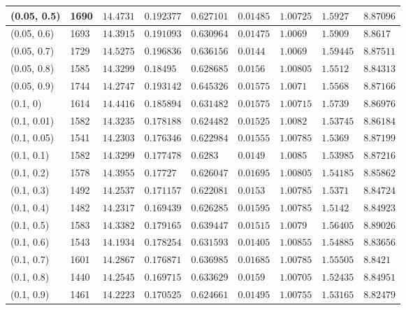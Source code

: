 \begin{center}
{\begin{longtable}{| l | p{} |  p{} | p{} | p{} | p{} | p{} | p{} | p{} |}
 (0.05, 0.5) & 1690  & $14.4731$ & $0.192377$ & $0.627101$ & $0.01485$ & $1.00725$ & $1.5927$ & $8.87096$ \\ \hline
 (0.05, 0.6) & 1693  & $14.3915$ & $0.191093$ & $0.630964$ & $0.01475$ & $1.0069$ & $1.5909$ & $8.8617$ \\ \hline
 (0.05, 0.7) & 1729  & $14.5275$ & $0.196836$ & $0.636156$ & $0.0144$ & $1.0069$ & $1.59445$ & $8.87511$ \\ \hline
 (0.05, 0.8) & 1585  & $14.3299$ & $0.18495$ & $0.628685$ & $0.0156$ & $1.00805$ & $1.5512$ & $8.84313$ \\ \hline
 (0.05, 0.9) & 1744  & $14.2747$ & $0.193142$ & $0.645326$ & $0.01575$ & $1.0071$ & $1.5568$ & $8.87166$ \\ \hline
 (0.1, 0) & 1614  & $14.4416$ & $0.185894$ & $0.631482$ & $0.01575$ & $1.00715$ & $1.5739$ & $8.86976$ \\ \hline
 (0.1, 0.01) & 1582  & $14.3235$ & $0.178188$ & $0.624482$ & $0.01525$ & $1.0082$ & $1.53745$ & $8.86184$ \\ \hline
 (0.1, 0.05) & 1541  & $14.2303$ & $0.176346$ & $0.622984$ & $0.01555$ & $1.00785$ & $1.5369$ & $8.87199$ \\ \hline
 (0.1, 0.1) & 1582  & $14.3299$ & $0.177478$ & $0.6283$ & $0.0149$ & $1.0085$ & $1.53985$ & $8.87216$ \\ \hline
 (0.1, 0.2) & 1578  & $14.3955$ & $0.17727$ & $0.626047$ & $0.01695$ & $1.00805$ & $1.54185$ & $8.85862$ \\ \hline
 (0.1, 0.3) & 1492  & $14.2537$ & $0.171157$ & $0.622081$ & $0.0153$ & $1.00785$ & $1.5371$ & $8.84724$ \\ \hline
 (0.1, 0.4) & 1482  & $14.2317$ & $0.169439$ & $0.626285$ & $0.01595$ & $1.00785$ & $1.5142$ & $8.84923$ \\ \hline
 (0.1, 0.5) & 1583  & $14.3382$ & $0.179165$ & $0.639447$ & $0.01515$ & $1.0079$ & $1.56405$ & $8.89026$ \\ \hline
 (0.1, 0.6) & 1543  & $14.1934$ & $0.178254$ & $0.631593$ & $0.01405$ & $1.00855$ & $1.54885$ & $8.83656$ \\ \hline
 (0.1, 0.7) & 1601  & $14.2867$ & $0.176871$ & $0.636985$ & $0.01685$ & $1.00785$ & $1.55505$ & $8.8421$ \\ \hline
 (0.1, 0.8) & 1440  & $14.2545$ & $0.169715$ & $0.633629$ & $0.0159$ & $1.00705$ & $1.52435$ & $8.84951$ \\ \hline
 (0.1, 0.9) & 1461  & $14.2223$ & $0.170525$ & $0.624661$ & $0.01495$ & $1.00755$ & $1.53165$ & $8.82479$ \\ \hline

\end{longtable}}
\end{center}
